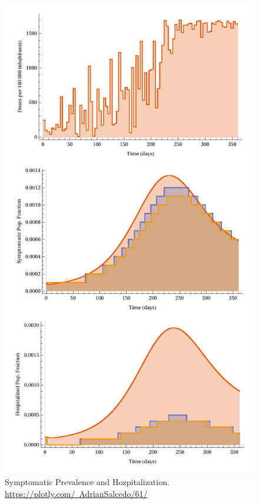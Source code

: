 \begin{figure}[tbh]
    \centering
    \includegraphics[scale=0.65, keepaspectratio]{figs/VaccinationEffect}
    \caption{Symptomatic Prevalence and Hozpitalization.
        \href{https://plotly.com/~AdrianSalcedo/61/}
        {https://plotly.com/~AdrianSalcedo/61/}}
    \label{fig:vaccinationeffect}
\end{figure}
